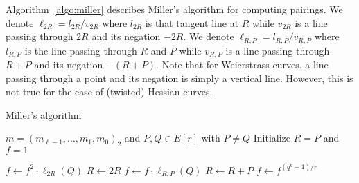 Algorithm~\ref{algo:miller} describes Miller's algorithm for computing pairings.
We denote $\ell_{2R} = l_{2R} / v_{2R}$ where $l_{2R}$ is that tangent line at $R$
while $v_{2R}$ is a line passing through $2R$ and its negation $-2R$.
We denote $\ell_{R,P} = l_{R,P} / v_{R,P}$ where $l_{R,P}$ is the line passing through $R$ and $P$
while $v_{R,P}$ is a line passing through $R+P$ and its negation $-(R+P)$.
Note that for Weierstrass curves, a line passing through a point and its negation is simply a vertical line.
However, this is not true for the case of (twisted) Hessian curves.

\begin{algorithm}
\caption{Miller's algorithm}
\label{algo:miller}
\begin{algorithmic}[1]

	\Require $m = (m_{\ell-1}, \dots, m_1, m_0)_2$ and $P,Q \in E[r]$ with $P \ne Q$
	\State Initialize $R = P$ and $f = 1$

		\State $f \leftarrow f^2 \cdot \ell_{2R}(Q)$
		\State $R \leftarrow 2R$
			\State $f \leftarrow f \cdot \ell_{R,P}(Q)$
			\State $R \leftarrow R+P$
		\EndIf
	\EndFor
	\State $f \leftarrow f^{(q^k-1)/r}$

\end{algorithmic}
\end{algorithm}
